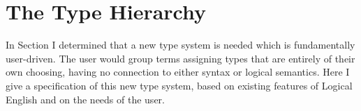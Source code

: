 \documentclass[../main.tex]{subfiles}
\begin{document}

\section{The Type Hierarchy}
\label{section:type-hierarchy}
In Section \cite{section:type-system-review} I determined that a new type system is needed which is fundamentally user-driven. The user would group terms assigning types that are entirely of their own choosing, having no connection to either syntax or logical semantics. Here I give a specification of this new type system, based on existing features of Logical English and on the needs of the user.
\end{document}

